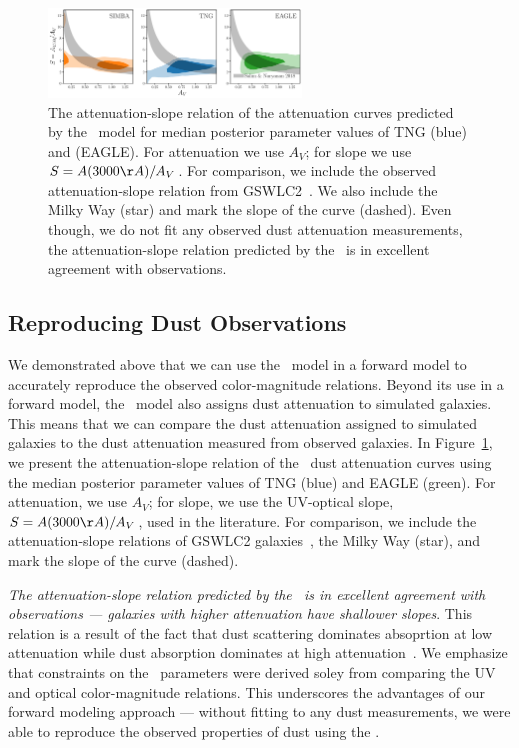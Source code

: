 \begin{figure}
\begin{center}
    \includegraphics[width=0.6\textwidth]{figs/abc_slope_AV_all.pdf}
    \caption{\label{fig:slope}
    The attenuation-slope relation of the attenuation curves predicted by the
    \eda~model for median posterior parameter values of TNG (blue) and (EAGLE). 
    For attenuation we use $A_V$; for slope we use $S = A(3000\AA)/A_V$. For
    comparison, we include the observed attenuation-slope relation from 
    GSWLC2~\citep{salim2020}. We also include the Milky Way (star) and mark the
    slope of the \cite{calzetti2001} curve (dashed). Even though, we do not fit
    any observed dust attenuation measurements, the attenuation-slope relation
    predicted by the \eda~is in excellent agreement with observations. 
    }
\end{center}
\end{figure}

\subsection{Reproducing Dust Observations} 
We demonstrated above that we can use the \eda~model in a forward model to
accurately reproduce the observed color-magnitude relations. Beyond its use in
a forward model, the \eda~model also assigns dust attenuation to simulated
galaxies. This means that we can compare the dust attenuation assigned to
simulated galaxies to the dust attenuation measured from observed galaxies.  
In Figure~\ref{fig:slope}, we present the attenuation-slope relation of the
\eda~dust attenuation curves using the median posterior parameter values 
of TNG (blue) and EAGLE (green). For attenuation, we use $A_V$; for slope, we
use the UV-optical slope, $S = A(3000\AA)/A_V$, used in the literature. For
comparison, we include the
attenuation-slope relations of GSWLC2 galaxies~\citep[grey;][]{salim2020}, the
Milky Way (star), and mark the slope of the \cite{calzetti2001} curve (dashed). 

\emph{The attenuation-slope relation predicted by the \eda~is in excellent agreement
with observations --- galaxies with higher attenuation have shallower slopes}. 
This relation is a result of the fact that dust scattering dominates absoprtion
at low attenuation while dust absorption dominates at high 
attenuation~\citep{gordon1994, witt2000, draine2003, chevallard2013}. We
emphasize that constraints on the \eda~parameters were derived soley from 
comparing the UV and optical color-magnitude relations. This underscores the 
advantages of our forward modeling approach --- without fitting to any dust 
measurements, we were able to reproduce the observed properties of dust using
the \eda.

